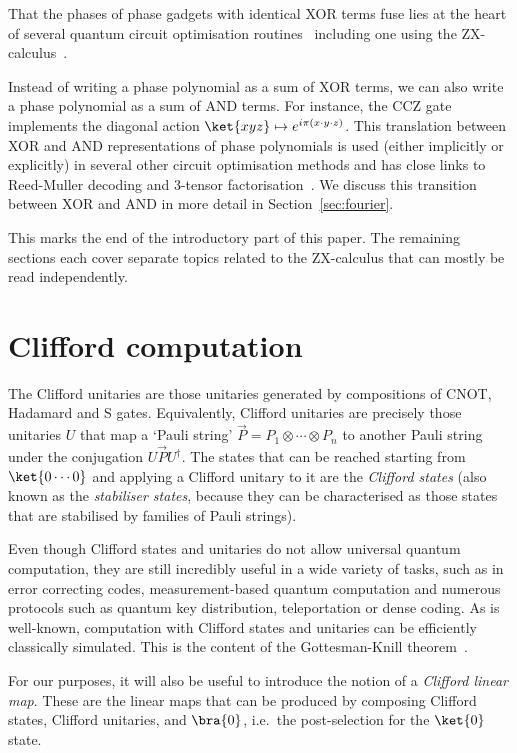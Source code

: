 \documentclass[a4paper,onecolumn,superscriptaddress,11pt,%
				unpublished,%
				allowfontchageintitle,%
				]{quantumarticle}
\begin{document}
That the phases of phase gadgets with identical XOR terms fuse lies at the heart of several quantum circuit optimisation routines~\cite{nam2018automated,amy2014polynomial} including one using the ZX-calculus~\cite{kissinger2019tcount}.

Instead of writing a phase polynomial as a sum of XOR terms, we can also write a phase polynomial as a sum of AND terms. For instance, the CCZ gate implements the diagonal action $\ket{xyz} \mapsto e^{i\pi (x\cdot y\cdot z)}$. This translation between XOR and AND representations of phase polynomials is used (either implicitly or explicitly) in several other circuit optimisation methods and has close links to Reed-Muller decoding and 3-tensor factorisation~\cite{amy2016t,heyfron2018efficient,deBeaudrap2020Techniques}. We discuss this transition between XOR and AND in more detail in Section~\ref{sec:fourier}.

This marks the end of the introductory part of this paper. The remaining sections each cover separate topics related to the ZX-calculus that can mostly be read independently.

\section{Clifford computation}\label{sec:clifford}

The Clifford unitaries are those unitaries generated by compositions of CNOT, Hadamard and S gates. Equivalently, Clifford unitaries are precisely those unitaries $U$ that map a `Pauli string' $\vec{P} = P_1\otimes \cdots \otimes P_n$ to another Pauli string under the conjugation $U\vec{P}U^\dagger$.
The states that can be reached starting from $\ket{0\cdots 0}$ and applying a Clifford unitary to it are the \emph{Clifford states} (also known as the \emph{stabiliser states}, because they can be characterised as those states that are stabilised by families of Pauli strings).

Even though Clifford states and unitaries do not allow universal quantum computation, they are still incredibly useful in a wide variety of tasks, such as in error correcting codes, measurement-based quantum computation and numerous protocols such as quantum key distribution, teleportation or dense coding.
As is well-known, computation with Clifford states and unitaries can be efficiently classically simulated. This is the content of the Gottesman-Knill theorem~\cite{aaronsongottesman2004}.

For our purposes, it will also be useful to introduce the notion of a \emph{Clifford linear map}. These are the linear maps that can be produced by composing Clifford states, Clifford unitaries, and $\bra{0}$, i.e.~the post-selection for the $\ket{0}$ state.
\end{document}

